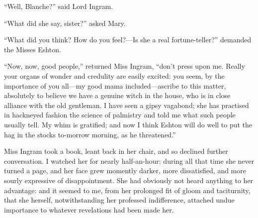 \enquote{Well, Blanche?} said Lord Ingram.

\enquote{What did she say, sister?} asked Mary.

\enquote{What did you think? How do you feel?---Is she a real
	fortune-teller?} demanded the Misses Eshton.

\enquote{Now, now, good people,} returned Miss Ingram, \enquote{don't
	press upon me. Really your organs of wonder and credulity are easily
	excited: you seem, by the importance of you all---my good mama
	included---ascribe to this matter, absolutely to believe we have a
	genuine witch in the house, who is in close alliance with the old
	gentleman. I have seen a gipsy vagabond; she has practised in hackneyed
	fashion the science of palmistry and told me what such people usually
	tell. My whim is gratified; and now I think \Mr{} Eshton will do well to
	put the hag in the stocks to-morrow morning, as he threatened.}

Miss Ingram took a book, leant back in her chair, and so declined
further conversation. I watched her for nearly half-an-hour: during all
that time she never turned a page, and her face grew momently darker,
more dissatisfied, and more sourly expressive of disappointment. She
had obviously not heard anything to her advantage: and it seemed to me,
from her prolonged fit of gloom and taciturnity, that she herself,
notwithstanding her professed indifference, attached undue importance to
whatever revelations had been made her.

